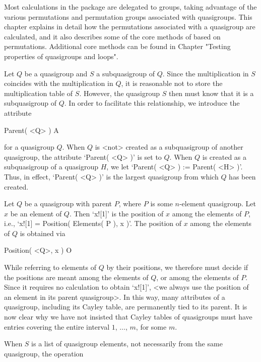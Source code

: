 
Most calculations in the {\LOOPS} package are delegated to groups, taking
advantage of the various permutations and permutation groups associated with
quasigroups. This chapter explains in detail how the permutations associated
with a quasigroup are calculated, and it also describes some of the core
methods of {\LOOPS} based on permutations. Additional core methods can be found
in Chapter "Testing properties of quasigroups and loops".


Let $Q$ be a quasigroup and $S$ a subquasigroup of $Q$. Since the
multiplication in $S$ coincides with the multiplication in $Q$, it is
reasonable not to store the multiplication table of $S$. However, the
quasigroup $S$ then must know that it is a subquasigroup of $Q$. In order to
facilitate this relationship, we introduce the attribute

\>Parent( <Q> ) A

for a quasigroup $Q$. When $Q$ is <not> created as a subquasigroup of
another quasigroup, the attribute `Parent( <Q> )' is set to $Q$. When $Q$ is
created as a subquasigroup of a quasigroup $H$, we let `Parent( <Q> ) :=
Parent( <H> )'. Thus, in effect, `Parent( <Q> )' is the largest quasigroup from
which $Q$ has been created.

Let $Q$ be a quasigroup with parent $P$, where $P$ is some $n$-element
quasigroup. Let $x$ be an element of $Q$. Then `x![1]' is the position of $x$
among the elements of $P$, i.e., `x![1] = Position( Elements( P ), x )'. The
position of $x$ among the elements of $Q$ is obtained via

\>Position( <Q>, x ) O

While referring to elements of $Q$ by their positions, we therefore must decide
if the positions are meant among the elements of $Q$, or among the elements of
$P$. Since it requires no calculation to obtain `x![1]', <we always use the
position of an element in its parent quasigroup>. In this way, many attributes
of a quasigroup, including its Cayley table, are permanently tied to its
parent. It is now clear why we have not insisted that Cayley tables of
quasigroups must have entries covering the entire interval $1$, $\dots$, $m$,
for some $m$.

When $S$ is a list of quasigroup elements, not necessarily from the same
quasigroup, the operation

